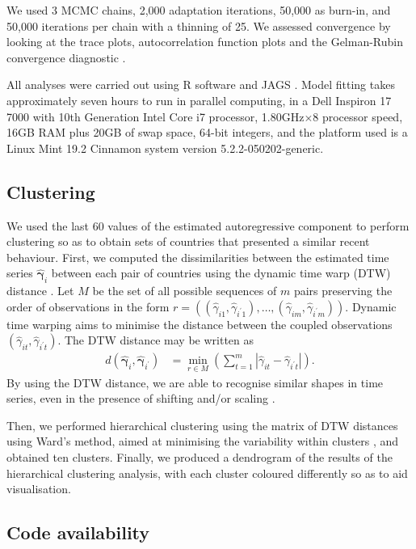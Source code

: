 \documentclass[fleqn,10pt]{wlscirep}
\begin{document}
We used 3 MCMC chains, 2,000 adaptation iterations, 50,000 as burn-in, and 50,000 iterations per chain with a thinning of 25. We assessed convergence by looking at the trace plots, autocorrelation function plots and the Gelman-Rubin convergence diagnostic \cite{Gelman1992}.

All analyses were carried out using R software \cite{RcoreTeam2020} and JAGS \cite{Denwood2016}. Model fitting takes approximately seven hours to run in parallel computing, in a Dell Inspiron 17 7000 with 10th Generation Intel Core i7 processor, 1.80GHz$\times$8 processor speed, 16GB RAM plus 20GB of swap space, 64-bit integers, and the platform used is a Linux Mint 19.2 Cinnamon system version 5.2.2-050202-generic.

\subsection*{Clustering}

We used the last 60 values of the estimated autoregressive component to perform clustering so as to obtain sets of countries that presented a similar recent behaviour. First, we computed the dissimilarities between the estimated time series $\boldsymbol{\hat\gamma}_i$ between each pair of countries using the dynamic time warp (DTW) distance \cite{Muller2007,Montero2014}. Let $M$ be the set of all possible sequences of $m$ pairs preserving the order of observations in the form $r=((\hat\gamma_{i1}, \hat\gamma_{i^\prime 1}),\ldots,(\hat\gamma_{im}, \hat\gamma_{i^\prime m}))$. Dynamic time warping aims to minimise the distance between the coupled observations $(\hat\gamma_{it}, \hat\gamma_{i^\prime t})$. The DTW distance may be written as
\begin{align*}
d(\boldsymbol{\hat\gamma}_i,\boldsymbol{\hat\gamma}_{i^\prime})&=\min_{r\in M}\left(\sum_{t=1}^m|\hat\gamma_{it}-\hat\gamma_{i^\prime t}|\right).
\end{align*}
By using the DTW distance, we are able to recognise similar shapes in time series, even in the presence of shifting and/or scaling \cite{Montero2014}.

Then, we performed hierarchical clustering using the matrix of DTW distances using Ward's method, aimed at minimising the variability within clusters \cite{Murtagh2014}, and obtained ten clusters. Finally, we produced a dendrogram of the results of the hierarchical clustering analysis, with each cluster coloured differently so as to aid visualisation.

\subsection*{Code availability}
\end{document}
